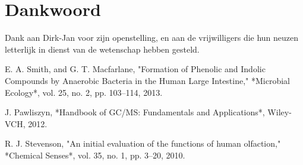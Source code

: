 \documentclass{BK5}
\begin{document}
	\section*{Dankwoord}
	Dank aan Dirk-Jan voor zijn openstelling, en aan de vrijwilligers die hun neuzen letterlijk in dienst van de wetenschap hebben gesteld.
	
	\begin{thebibliography}{9}
		E. A. Smith, and G. T. Macfarlane, "Formation of Phenolic and Indolic Compounds by Anaerobic Bacteria in the Human Large Intestine," *Microbial Ecology*, vol. 25, no. 2, pp. 103–114, 2013.
		
		J. Pawliszyn, *Handbook of GC/MS: Fundamentals and Applications*, Wiley-VCH, 2012.
		
		R. J. Stevenson, "An initial evaluation of the functions of human olfaction," *Chemical Senses*, vol. 35, no. 1, pp. 3–20, 2010.
		
	\end{thebibliography}
	
\end{document}
